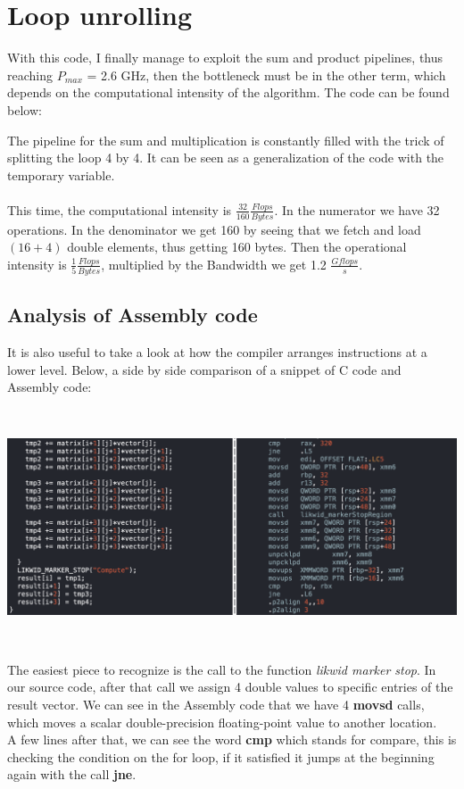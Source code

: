 \documentclass[11pt,a4paper,oneside,titlepage,openright]{book}
\begin{document}
\chapter{Loop unrolling}
With this code, I finally manage to exploit the sum and product pipelines, thus reaching $P_{max}$ = 2.6 GHz, then the bottleneck must be in the other term, which depends on the computational intensity of the algorithm. 
The code can be found below: 

The pipeline for the sum and multiplication is constantly filled with the trick of splitting the loop 4 by 4. It can be seen as a generalization of the code with the temporary variable. \\\\
This time, the computational intensity is $\frac{32}{160}\frac{Flops}{Bytes}$. In the numerator we have 32 operations. In the denominator we get 160 by seeing that we fetch and load $(16+4)$ double elements, thus getting 160 bytes. 
Then the operational intensity is $\frac{1}{5}\frac{Flops}{Bytes}$, multiplied by the Bandwidth we get 1.2 $\frac{Gflops}{s}$. 

\section{Analysis of Assembly code} 
It is also useful to take a look at how the compiler arranges instructions at a lower level. Below, a side by side comparison of a snippet of C code and Assembly code: 
\begin{center}
\includegraphics[width=14cm, height=7cm]{assembly_screen}
\end{center}
The easiest piece to recognize is the call to the function \textit{likwid marker stop}. In our source code, after that call we assign 4 double values to specific entries of the result vector. We can see in the Assembly code that we have 4 \textbf{movsd} calls, which moves a scalar double-precision floating-point value to another location.\\ A few lines after that, we can see the word \textbf{cmp} which stands for compare, this is checking the condition on the for loop, if it satisfied it jumps at the beginning again with the call \textbf{jne}.
\end{document}
